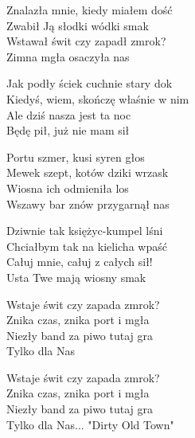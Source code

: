 \begin{text}
    Znalazła mnie, kiedy miałem dość\\
    Zwabił Ją słodki wódki smak\\
    Wstawał świt czy zapadł zmrok?\\
    Zimna mgła osaczyła nas

    Jak podły ściek cuchnie stary dok\\
    Kiedyś, wiem, skończę właśnie w nim\\
    Ale dziś nasza jest ta noc\\
    Będę pił, już nie mam sił

    Portu szmer, kusi syren głos\\
    Mewek szept, kotów dziki wrzask\\
    Wiosna ich odmieniła los\\
    Wszawy bar znów przygarnął nas

    \vin Dziwnie tak księżyc-kumpel lśni\\
    \vin Chciałbym tak na kielicha wpaść\\
    \vin Całuj mnie, całuj z całych sił!\\
    \vin Usta Twe mają wiosny smak

    Wstaje świt czy zapada zmrok?\\
    Znika czas, znika port i mgła\\
    Niezły band za piwo tutaj gra\\
    Tylko dla Nas

    Wstaje świt czy zapada zmrok?\\
    Znika czas, znika port i mgła\\
    Niezły band za piwo tutaj gra\\
    Tylko dla Nas... "Dirty Old Town"
\end{text}
\begin{chord}

\end{chord}